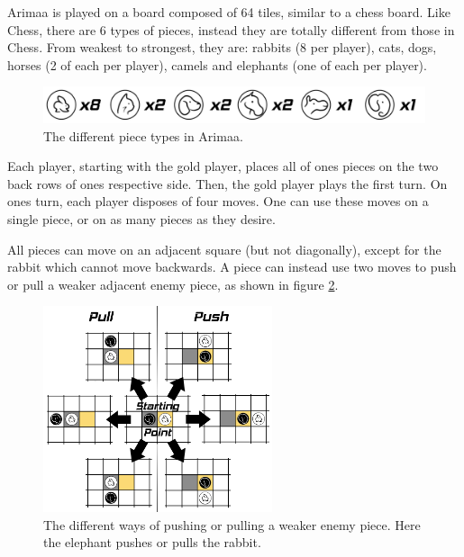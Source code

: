 \label{first part}
Arimaa is played on a board composed of 64 tiles, similar to a chess board. Like Chess, there are 6 types of pieces, instead they are totally different from those in Chess. From weakest to strongest, they are: rabbits (8 per player), cats, dogs, horses (2 of each per player), camels and elephants (one of each per player).%

\begin{figure}[!h]
\centering
\includegraphics[width=\textwidth]{2TheGame_Gabriel/Pictures/Pieces.png}
\caption{The different piece types in Arimaa.}
\label{fig:pieces}
\end{figure}

Each player, starting with the gold player, places all of ones pieces on the two back rows of ones respective side. Then, the gold player plays the first turn.
On ones turn, each player disposes of four moves. One can use these moves on a single piece, or on as many pieces as they desire.

All pieces can move on an adjacent square (but not diagonally), except for the rabbit which cannot move backwards.
A piece can instead use two moves to push or pull a weaker adjacent enemy piece, as shown in figure \ref{fig:displace}.

\begin{figure}[!h]
\centering
\includegraphics[width=0.6\textwidth]{2TheGame_Gabriel/Pictures/Displace.png}
\caption[The different ways of pushing or pulling a weaker enemy piece.]{The different ways of pushing or pulling a weaker enemy piece. Here the elephant pushes or pulls the rabbit.}
\label{fig:displace}
\end{figure}

